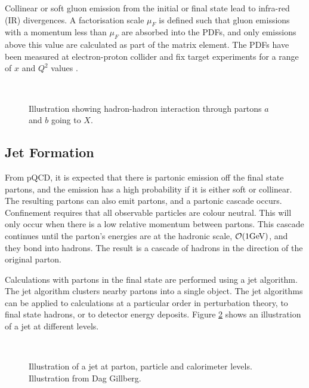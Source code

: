 Collinear or soft gluon emission from the initial or final state lead to infra-red (IR) divergences.  
A factorisation scale $\mu_F$ is defined such that gluon emissions with a momentum less than $\mu_F$ are absorbed into the PDFs, and only emissions above this value are calculated as part of the matrix element. 
The PDFs have been measured at electron-proton collider and fix target experiments for a range of $x$ and $Q^2$ values \cite{ref:PDF1,ref:PDF2,ref:MRST}. 

\begin{figure}
\centering
\mbox{
                              }
\caption[Illustration of a hadron-hadron interaction]{
Illustration showing hadron-hadron interaction through partons $a$ and $b$ going to $X$. 
\label{Theory:HadronHadron}}
\end{figure}


\subsection{Jet Formation}

From pQCD, it is expected that there is partonic emission off the final state partons, and the emission has a high probability if it is either soft or collinear. 
The resulting partons can also emit partons, and a partonic cascade occurs.
Confinement requires that all observable particles are colour neutral. 
This will only occur when there is a low relative momentum between partons.
This cascade continues until the parton's energies are at the hadronic scale, $\mathcal{O}(1\rm GeV)$, and they bond into hadrons.
The result is a cascade of hadrons in the direction of the original parton.

Calculations with partons in the final state are performed using a jet algorithm.  
The jet algorithm clusters nearby partons into a single object.
The jet algorithms can be applied to calculations at a particular order in perturbation theory, to final state hadrons, or to detector energy deposits.
Figure \ref{Theory:InitJet} shows an illustration of a jet at different levels.


\begin{figure}
\centering
\mbox{
                              }
\caption[Jets at parton, particle and calorimeter levels]{
Illustration of a jet at parton, particle and calorimeter levels. 
Illustration from Dag Gillberg.
\label{Theory:InitJet}}
\end{figure}

